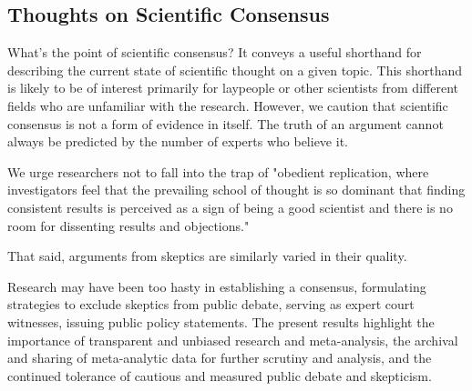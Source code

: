 \documentclass[man]{apa6}
\begin{document}
\subsection{Thoughts on Scientific Consensus}
What's the point of scientific consensus? It conveys a useful shorthand for describing the current state of scientific thought on a given topic. This shorthand is likely to be of interest primarily for laypeople or other scientists from different fields who are unfamiliar with the research. However, we caution that scientific consensus is not a form of evidence in itself. The truth of an argument cannot always be predicted by the number of experts who believe it. 

We urge researchers not to fall into the trap of "obedient replication, where investigators feel that the prevailing school of thought is so dominant that finding consistent results is perceived as a sign of being a good scientist and there is no room for dissenting results and objections." \citep{Ioannidis:2012} %

That said, arguments from skeptics are similarly varied in their quality. 

Research may have been too hasty in establishing a consensus, formulating strategies to exclude skeptics from public debate, serving as expert court witnesses, issuing public policy statements. The present results highlight the importance of transparent and unbiased research and meta-analysis, the archival and sharing of meta-analytic data for further scrutiny and analysis, and the continued tolerance of cautious and measured public debate and skepticism.



\newpage


\end{document}
